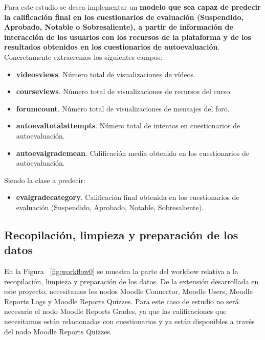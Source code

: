 Para este estudio se desea implementar un \textbf{modelo que sea capaz de predecir la calificación final en los cuestionarios de evaluación (Suspendido, Aprobado, Notable o Sobresaliente), 
a partir de información de interacción de los usuarios con los recursos de la plataforma y de los resultados obtenidos en los cuestionarios de autoevaluación}. 
Concretamente extraeremos los siguientes campos: 

\begin{itemize}
	\item \textbf{videosviews}. Número total de visualizaciones de vídeos.
	\item \textbf{courseviews}. Número total de visualizaciones de recursos del curso.
	\item \textbf{forumcount}. Número total de visualizaciones de mensajes del foro. 
	\item \textbf{autoevaltotalattempts}. Número total de intentos en cuestionarios de autoevaluación. 
	\item \textbf{autoevalgrademean}. Calificación media obtenida en los cuestionarios de autoevaluación.
\end{itemize}

Siendo la clase a predecir: 

\begin{itemize}
	\item \textbf{evalgradecategory}. Calificación final obtenida en los cuestionarios de evaluación (Suspendido, Aprobado, Notable, Sobresaliente). 
\end{itemize}


\subsection{Recopilación, limpieza y preparación de los datos}

En la Figura ~\ref{fig:workflow0} se muestra la parte del workflow relativa a la recopilación, limpieza y preparación de los datos. De la extensión desarrollada en 
este proyecto, necesitamos los nodos Moodle Connector, Moodle Users, Moodle Reports Logs y Moodle Reports Quizzes. Para este caso de estudio no 
será necesario el nodo Moodle Reports Grades, ya que las calificaciones que necesitamos están relacionadas con cuestionarios y ya están disponibles a través del nodo Moodle Reports Quizzes. 

